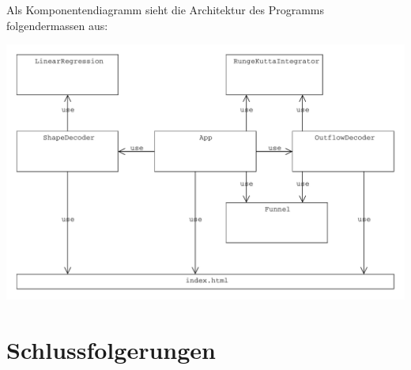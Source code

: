 \documentclass[11pt]{scrreprt} %
\theoremstyle{definition}
\begin{document}
Als Komponentendiagramm sieht die Architektur des Programms folgendermassen aus:

\includegraphics[scale=0.5]{biltli/architecture.pdf}

\chapter{Schlussfolgerungen}



\end{document}
